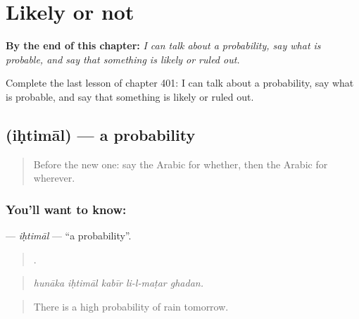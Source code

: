 
\chapter{Likely or not}
\label{ch:ar-likely-or-not}

\begin{chapteropening}
\textbf{By the end of this chapter:} \emph{I can talk about a probability, say what is probable, and say that something is likely or ruled out.}

Complete the last lesson of chapter 401: I can talk about a probability, say what is probable, and say that something is likely or ruled out.
\end{chapteropening}

\section[\texorpdfstring{\ar{احتمال} (iḥtimāl)}{احتمال (iḥtimāl)}]{ (iḥtimāl) — a probability}

\label{lesson:AR-C401-ihtimal}



\begin{quote}
Before the new one: say the Arabic for whether, then the Arabic for wherever.
\end{quote}

\subsection*{You'll want to know: }
\textbf{} — \emph{iḥtimāl} — \textquotedblleft{}a probability\textquotedblright{}.

\begin{quote}
    .
\end{quote}

\begin{quote}
\emph{hunāka iḥtimāl kabīr li-l-maṭar ghadan.}
\end{quote}

\begin{quote}
There is a high probability of rain tomorrow.
\end{quote}


